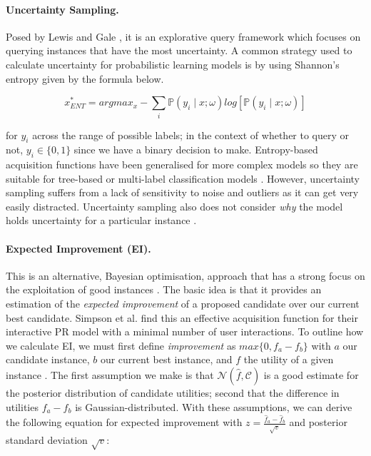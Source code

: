 \paragraph{Uncertainty Sampling.} Posed by Lewis and Gale \cite{Lewis94}, it is an explorative query framework which focuses on querying instances that have the most uncertainty. A common strategy used to calculate uncertainty for probabilistic learning models is by using Shannon’s entropy \cite{Shannon48} given by the formula below.

$$
	x^{\ast}_{ENT} = argmax_{x} - \sum_i \mathbb{P}(y_i \mid x; \omega) log \left[ \mathbb{P}(y_i \mid x; \omega) \right]
$$

\noindent
for $y_i$ across the range of possible labels; in the context of whether to query or not, $y_i \in \{0,1\}$ since we have a binary decision to make. Entropy-based acquisition functions have been generalised for more complex models so they are suitable for tree-based or multi-label classification models \cite{Craven08, Hwa04}. However, uncertainty sampling suffers from a lack of sensitivity to noise and outliers as it can get very easily distracted. Uncertainty sampling also does not consider \emph{why} the model holds uncertainty for a particular instance \cite{Sharma17}.

\paragraph{Expected Improvement (EI).} This is an alternative, Bayesian optimisation, approach that has a strong focus on the exploitation of good instances \cite{Mockus75}. The basic idea is that it provides an estimation of the \emph{expected improvement} of a proposed candidate over our current best candidate. Simpson et al. \cite{Simpson19} find this an effective acquisition function for their interactive PR model with a minimal number of user interactions. To outline how we calculate EI, we must first define \emph{improvement} as $max\{0, f_a - f_b\}$ with $a$ our candidate instance, $b$ our current best instance, and $f$ the utility of a given instance \cite{Simpson19}. The first assumption we make is that $\mathcal{N}(\hat{f}, \mathcal{C})$ is a good estimate for the posterior distribution of candidate utilities; second that the difference in utilities $f_a - f_b$ is Gaussian-distributed. With these assumptions, we can derive the following equation for expected improvement with $z = \frac{\hat{f}_a - \hat{f}_b}{\sqrt{v}}$ and posterior standard deviation $\sqrt{v}$:

